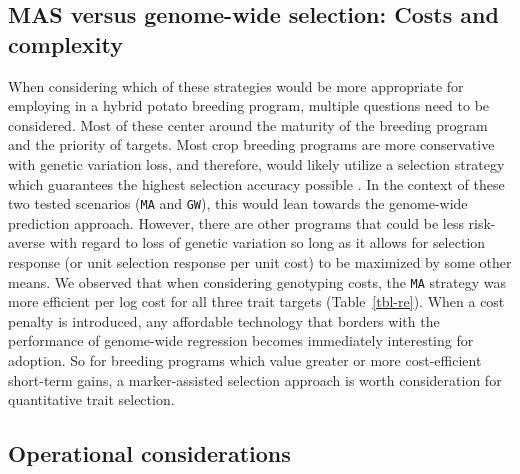 \begin{refsection}
\subsection{MAS versus genome-wide selection: Costs and
complexity}\label{mas-versus-genome-wide-selection-costs-and-complexity}

When considering which of these strategies would be more appropriate for
employing in a hybrid potato breeding program, multiple questions need
to be considered. Most of these center around the maturity of the
breeding program and the priority of targets. Most crop breeding
programs are more conservative with genetic variation loss, and
therefore, would likely utilize a selection strategy which guarantees
the highest selection accuracy possible
\parencite{Swarup2021,Rasmusson1997}. In the context of these two tested
scenarios (\texttt{MA} and \texttt{GW}), this would lean towards the
genome-wide prediction approach. However, there are other programs that
could be less risk-averse with regard to loss of genetic variation so
long as it allows for selection response (or unit selection response per
unit cost) to be maximized by some other means. We observed that when
considering genotyping costs, the \texttt{MA} strategy was more
efficient per log cost for all three trait targets (Table~\ref{tbl-re}).
When a cost penalty is introduced, any affordable technology that
borders with the performance of genome-wide regression becomes
immediately interesting for adoption. So for breeding programs which
value greater or more cost-efficient short-term gains, a marker-assisted
selection approach is worth consideration for quantitative trait
selection.

\subsection{Operational
considerations}\label{operational-considerations}


\end{refsection}
